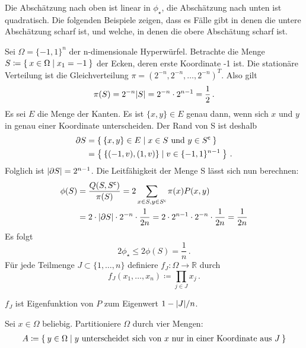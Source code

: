 \documentclass[ngerman,a4paper,11pt]{scrartcl}
\newcommand{\stcomp}[1]{{#1}^{\mathsf{c}}} %
\newcommand{\RR}{\mathbb{R}}
\DeclarePairedDelimiter{\abs}{\lvert}{\rvert}		%
\begin{document}
\begin{rem}
 Die Abschätzung nach oben ist linear in $\phi_\star$, die Abschätzung nach
 unten ist quadratisch. Die folgenden Beispiele zeigen, dass es Fälle gibt in
 denen die untere Abschätzung scharf ist, und welche, in denen die obere
 Abschätung scharf ist. 
\end{rem}
\begin{exmp}
 Sei $\Omega=\{-1,1\}^n$ der n-dimensionale Hyperwürfel.
 Betrachte die Menge $S\coloneqq\Set{x\in\Omega\mid x_1=-1}$ der Ecken, deren
 erste Koordinate -1 ist. Die stationäre Verteilung ist die Gleichverteilung
 $\pi=(2^{-n},2^{-n},\dotsc,2^{-n})^T$. Also gilt 
 \begin{equation*}
  \pi(S)=2^{-n}\abs{S}=2^{-n}\cdot 2^{n-1}=\frac{1}{2}\, .
 \end{equation*}
 Es sei $E$ die Menge der Kanten.
 Es ist $\{x,y\}\in E$ genau dann, wenn sich $x$ und $y$ in genau einer Koordinate
 unterscheiden. Der Rand von S ist deshalb
 \begin{align*}
  \partial S&=\Set{\{x,y\}\in E\mid x\in S \text{ und } y\in\stcomp{S}} \\
            &=\Set{\{(-1,v), (1,v)\}\mid v\in\{-1,1\}^{n-1}}\, .
 \end{align*}
 Folglich ist $\abs{\partial S}=2^{n-1}$. Die Leitfähigkeit der Menge S lässt
 sich nun berechnen:
 \begin{align*}
  \phi(S)&=\frac{Q(S,\stcomp{S})}{\pi(S)}=2\sum_{x\in S,y\in\stcomp{S}}\pi(x)P(x,y) \\
  &=2\cdot\abs{\partial S}\cdot 2^{-n}\cdot \frac{1}{2n}=2\cdot2^{n-1}\cdot 2^{-n}\cdot \frac{1}{2n}
  =\frac{1}{2n}
 \end{align*}
 Es folgt 
 \begin{equation}
  \label{eq:phistar}
  2\phi_\star\leq 2\phi(S)=\frac{1}{n} \, .
 \end{equation} 
Für jede Teilmenge $J\subset\{1,\dotsc,n\}$ definiere $f_J:\Omega\to\RR$ durch
 \begin{equation*}
  f_J(x_1,\dotsc,x_n)\coloneqq\prod_{j\in J}x_j \, .
 \end{equation*}
 \begin{claim}
  $f_J$ ist Eigenfunktion von $P$ zum Eigenwert $1-\abs{J}/n$.
 \end{claim}
 \begin{dproof}
  Sei $x\in\Omega$ beliebig. Partitioniere $\Omega$ durch vier Mengen:
  \begin{align*}
  A&\coloneqq\Set{y\in\Omega\mid\text{$y$ unterscheidet sich von $x$ nur in einer Koordinate aus $J$}} \\ 

\end{align*}
\end{dproof}
\end{exmp}
\end{document}
